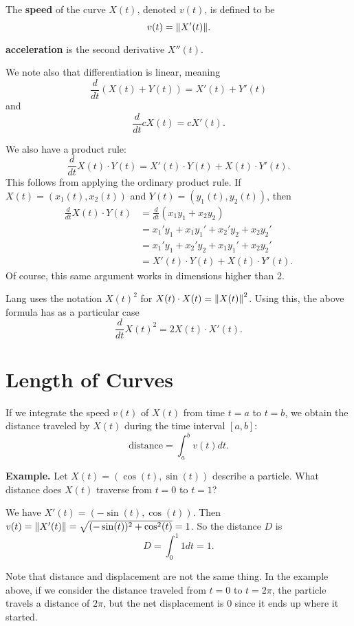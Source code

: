\documentclass{article}
\begin{document}
The \textbf{speed} of the curve $X(t)$, denoted $v(t)$, is defined to be 
\[v(t) = \norm{X'(t)}.\]

\textbf{acceleration} is the second derivative $X''(t)$.

We note also that differentiation is linear, meaning
\[\frac{d}{dt} \left( X(t) + Y(t) \right) = X'(t) + Y'(t)\]
and 
\[\frac{d}{dt} cX(t) = cX'(t).\]

We also have a product rule:
\[\frac{d}{dt} X(t) \cdot Y(t) = X'(t)\cdot Y(t) + X(t) \cdot Y'(t).\]
This follows from applying the ordinary product rule. If $X(t) = (x_1(t), x_2(t))$ and
$Y(t) = (y_1(t), y_2(t))$, then
\begin{align*}
    \frac{d}{dt} X(t) \cdot Y(t) &= \frac{d}{dt} (x_1y_1 + x_2y_2)\\
    &= x_1'y_1 + x_1y_1' + x_2'y_2 + x_2y_2'\\
    &= x_1'y_1 + x_2'y_2 + x_1y_1' + x_2y_2'\\
    &= X'(t)\cdot Y(t) + X(t) \cdot Y'(t).
\end{align*}
Of course, this same argument works in dimensions higher than 2.

Lang uses the notation $X(t)^2$ for $X(t)\cdot X(t)=\norm{X(t)}^2$. Using this, the above formula
has as a particular case
\[\frac{d}{dt} X(t)^2 = 2 X(t)\cdot X'(t). \]
\section*{Length of Curves}
If we integrate the speed $v(t)$ of $X(t)$ from time $t=a$ to $t=b$,
we obtain the distance traveled by $X(t)$ during the time interval $[a,b]$:
\[\text{distance} = \int_a^b v(t)dt.\]

\textbf{Example.} Let $X(t) = (\cos(t), \sin(t))$ describe a particle.
What distance does $X(t)$ traverse from $t=0$ to $t=1$?

We have $X'(t)=(-\sin(t), \cos(t))$. Then $v(t) = \norm{X'(t)} 
= \sqrt{(-\sin(t))^2 + \cos^2(t)} = 1$. So the distance $D$ is 
\[D = \int_0^1 1 dt = 1.\]

Note that distance and displacement are not the same thing. In the example above,
if we consider the distance traveled from $t=0$ to $t=2\pi$, the particle
travels a distance of $2\pi$, but the net displacement is $0$ since it
ends up where it started.
\end{document}
